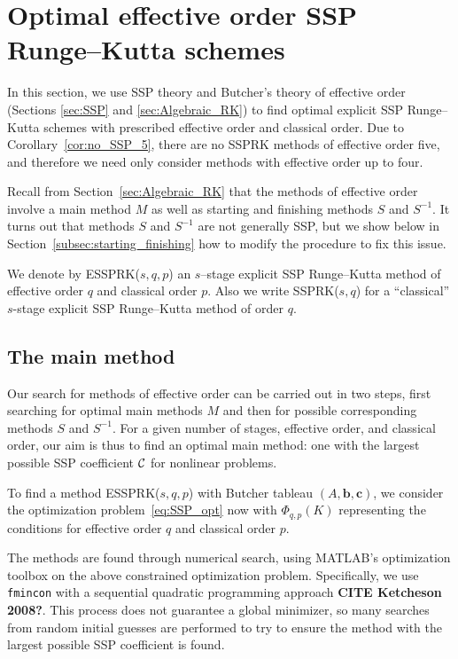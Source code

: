 \section{Optimal effective order SSP Runge--Kutta schemes}\label{sec:optimal_ESSPRK}

In this section, we use SSP theory and Butcher's theory of effective
order (Sections \ref{sec:SSP} and \ref{sec:Algebraic_RK}) to find
optimal explicit SSP Runge--Kutta schemes with prescribed effective
order and classical order.
Due to Corollary~\ref{cor:no_SSP_5}, there are no SSPRK methods of
effective order five, and therefore we need only consider methods with
effective order up to four.

Recall from Section~\ref{sec:Algebraic_RK} that the methods of
effective order involve a main method $M$ as well as starting and
finishing methods $S$ and $S^{-1}$.
It turns out that methods $S$ and $S^{-1}$ are not generally SSP, but
we show below in Section~\ref{subsec:starting_finishing} how to modify
the procedure to fix this issue.

We denote by ESSPRK($s,q,p$) an $s$--stage explicit SSP Runge--Kutta method of effective
order $q$ and classical order $p$.
Also we write SSPRK($s,q$) for a ``classical'' $s$-stage explicit SSP Runge--Kutta method of
order $q$.

\subsection{The main method}\label{subsec:main_method}

Our search for methods of effective order can be carried out in two
steps, first searching for optimal main methods $M$ and then for
possible corresponding methods $S$ and $S^{-1}$.
For a given number of stages, effective order, and classical order,
our aim is thus to find an optimal main method: one with the largest
possible SSP coefficient $\mathcal{C}$ for nonlinear problems.

To find a method ESSPRK($s,q,p$) with Butcher tableau $(A, \bm{b},
\bm{c})$, we consider the optimization problem~\eqref{eq:SSP_opt} now
with $\Phi_{q,p}(K)$ representing the conditions for effective order
$q$ and classical order $p$.

The methods are found through numerical search, using \textsc{MATLAB}'s optimization 
toolbox on the above constrained optimization problem. 
Specifically, we use \texttt{fmincon} with a sequential quadratic programming approach \textbf{CITE Ketcheson 2008?}.
This process does not guarantee a global minimizer, so many searches from random initial 
guesses are performed to try to ensure the method with the largest possible SSP coefficient is 
found.

